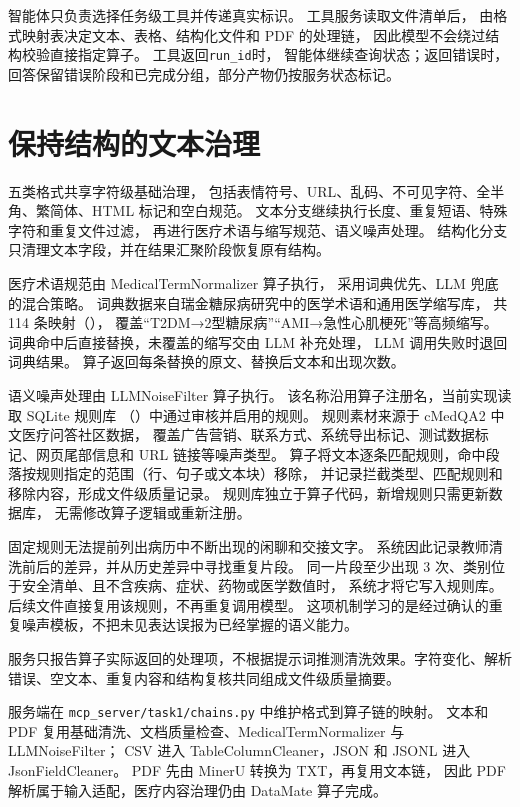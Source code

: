 智能体只负责选择任务级工具并传递真实标识。
工具服务读取文件清单后，
由格式映射表决定文本、表格、结构化文件和 PDF 的处理链，
因此模型不会绕过结构校验直接指定算子。
工具返回\texttt{run\_id}时，
智能体继续查询状态；返回错误时，
回答保留错误阶段和已完成分组，部分产物仍按服务状态标记。

\section{保持结构的文本治理}

五类格式共享字符级基础治理，
包括表情符号、URL、乱码、不可见字符、全半角、繁简体、HTML 标记和空白规范。
文本分支继续执行长度、重复短语、特殊字符和重复文件过滤，
再进行医疗术语与缩写规范、语义噪声处理。
结构化分支只清理文本字段，并在结果汇聚阶段恢复原有结构。

医疗术语规范由 MedicalTermNormalizer 算子执行，
采用词典优先、LLM 兜底的混合策略。
词典数据来自瑞金糖尿病研究中的医学术语和通用医学缩写库，
共 114 条映射（），
覆盖“T2DM→2型糖尿病”“AMI→急性心肌梗死”等高频缩写。
词典命中后直接替换，未覆盖的缩写交由 LLM 补充处理，
LLM 调用失败时退回词典结果。
算子返回每条替换的原文、替换后文本和出现次数。

语义噪声处理由 LLMNoiseFilter 算子执行。
该名称沿用算子注册名，当前实现读取 SQLite 规则库
（）中通过审核并启用的规则。
规则素材来源于 cMedQA2 中文医疗问答社区数据，
覆盖广告营销、联系方式、系统导出标记、测试数据标记、网页尾部信息和 URL 链接等噪声类型。
算子将文本逐条匹配规则，命中段落按规则指定的范围（行、句子或文本块）移除，
并记录拦截类型、匹配规则和移除内容，形成文件级质量记录。
规则库独立于算子代码，新增规则只需更新数据库，
无需修改算子逻辑或重新注册。

固定规则无法提前列出病历中不断出现的闲聊和交接文字。
系统因此记录教师清洗前后的差异，并从历史差异中寻找重复片段。
同一片段至少出现 3 次、类别位于安全清单、且不含疾病、症状、药物或医学数值时，
系统才将它写入规则库。后续文件直接复用该规则，不再重复调用模型。
这项机制学习的是经过确认的重复噪声模板，不把未见表达误报为已经掌握的语义能力。

服务只报告算子实际返回的处理项，不根据提示词推测清洗效果。字符变化、解析错误、空文本、重复内容和结构复核共同组成文件级质量摘要。

服务端在 \texttt{mcp\_server/task1/chains.py} 中维护格式到算子链的映射。
文本和 PDF 复用基础清洗、文档质量检查、MedicalTermNormalizer 与 LLMNoiseFilter；
CSV 进入 TableColumnCleaner，JSON 和 JSONL 进入 JsonFieldCleaner。
PDF 先由 MinerU 转换为 TXT，再复用文本链，
因此 PDF 解析属于输入适配，医疗内容治理仍由 DataMate 算子完成。

